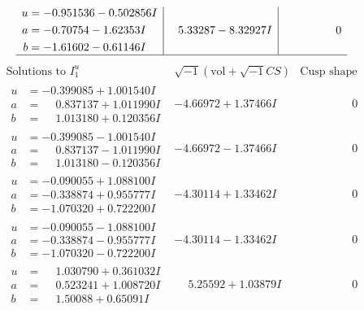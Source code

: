 \documentclass[1p]{elsarticle_modified}
\theoremstyle{definition}
\newcommand{\I}{\sqrt{-1}}
\begin{document}
$$\begin{array}{c|c|c}
\begin{aligned}
u &= -0.951536 - 0.502856 I \\
a &= -0.70754 - 1.62353 I \\
b &= -1.61602 - 0.61146 I\end{aligned}
 & \phantom{-}5.33287 - 8.32927 I & \phantom{-0.000000 } 0\\
 \hline 
 \end{array}$$\newpage$$\begin{array}{c|c|c}  
\text{Solutions to }I^u_{1}& \I (\text{vol} + \sqrt{-1}CS) & \text{Cusp shape}\\
 \hline 
\begin{aligned}
u &= -0.399085 + 1.001540 I \\
a &= \phantom{-}0.837137 + 1.011990 I \\
b &= \phantom{-}1.013180 + 0.120356 I\end{aligned}
 & -4.66972 + 1.37466 I & \phantom{-0.000000 } 0 \\ \hline\begin{aligned}
u &= -0.399085 - 1.001540 I \\
a &= \phantom{-}0.837137 - 1.011990 I \\
b &= \phantom{-}1.013180 - 0.120356 I\end{aligned}
 & -4.66972 - 1.37466 I & \phantom{-0.000000 } 0 \\ \hline\begin{aligned}
u &= -0.090055 + 1.088100 I \\
a &= -0.338874 + 0.955777 I \\
b &= -1.070320 + 0.722200 I\end{aligned}
 & -4.30114 + 1.33462 I & \phantom{-0.000000 } 0 \\ \hline\begin{aligned}
u &= -0.090055 - 1.088100 I \\
a &= -0.338874 - 0.955777 I \\
b &= -1.070320 - 0.722200 I\end{aligned}
 & -4.30114 - 1.33462 I & \phantom{-0.000000 } 0 \\ \hline\begin{aligned}
u &= \phantom{-}1.030790 + 0.361032 I \\
a &= \phantom{-}0.523241 + 1.008720 I \\
b &= \phantom{-}1.50088 + 0.65091 I\end{aligned}
 & \phantom{-}5.25592 + 1.03879 I & \phantom{-0.000000 } 0 \\ \hline\begin{aligned}

\end{aligned}
\end{array}$$
\end{document}
